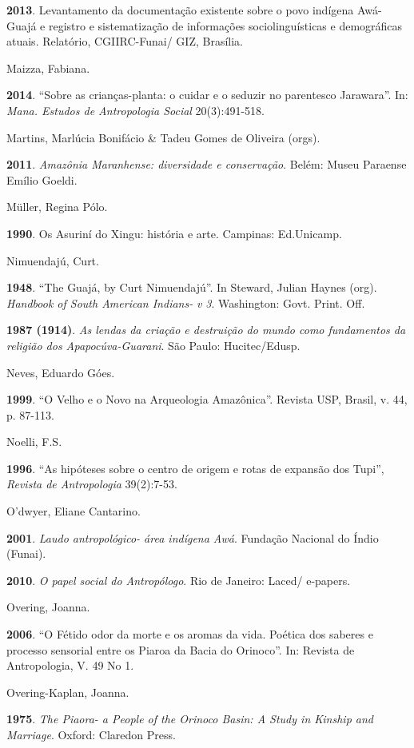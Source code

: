 \textbf{2013}. Levantamento da documentação existente sobre o povo
indígena Awá-Guajá e registro e sistematização de informações
sociolinguísticas e demográficas atuais. Relatório, CGIIRC-Funai/ GIZ,
Brasília.

Maizza, Fabiana.

\textbf{2014}. ``Sobre as crianças-planta: o cuidar e o seduzir no
parentesco Jarawara''. In: \emph{Mana. Estudos de Antropologia Social}
20(3):491-518.

Martins, Marlúcia Bonifácio \& Tadeu Gomes de Oliveira (orgs).

\textbf{2011}. \emph{Amazônia Maranhense: diversidade e conservação}.
Belém: Museu Paraense Emílio Goeldi.

Müller, Regina Pólo.

\textbf{1990}. Os Asuriní do Xingu: história e arte. Campinas:
Ed.Unicamp.

Nimuendajú, Curt.

\textbf{1948}. ``The Guajá, by Curt Nimuendajú''. In Steward, Julian
Haynes (org). \emph{Handbook of South American Indians-} \emph{v 3}.
Washington: Govt. Print. Off.

\textbf{1987 (1914)}. \emph{As lendas da criação e destruição do mundo
como fundamentos da religião dos Apapocúva-Guarani}. São Paulo:
Hucitec/Edusp.

Neves, Eduardo Góes.

\textbf{1999}. ``O Velho e o Novo na Arqueologia Amazônica''. Revista
USP, Brasil, v. 44, p. 87-113.

Noelli, F.S.

\textbf{1996}. ``As hipóteses sobre o centro de origem e rotas de
expansão dos Tupi'', \emph{Revista de Antropologia} 39(2):7-53.

O'dwyer, Eliane Cantarino.

\textbf{2001}. \emph{Laudo antropológico- área indígena Awá}. Fundação
Nacional do Índio (Funai).

\textbf{2010}. \emph{O papel social do Antropólogo}. Rio de Janeiro:
Laced/ e-papers.

Overing, Joanna.

\textbf{2006}. ``O Fétido odor da morte e os aromas da vida. Poética dos
saberes e processo sensorial entre os Piaroa da Bacia do Orinoco''. In:
Revista de Antropologia, V. 49 No 1.

Overing-Kaplan, Joanna.

\textbf{1975}. \emph{The Piaora- a People of the Orinoco Basin: A Study
in Kinship and Marriage}. Oxford: Claredon Press.

